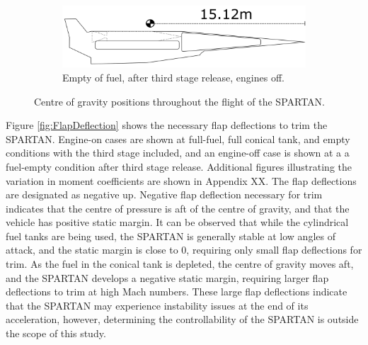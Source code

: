 \begin{figure}
\begin{subfigure}{.5\textwidth}
			\end{subfigure}
			\begin{subfigure}{.5\textwidth}
				\centering
				\includegraphics[width=0.9\linewidth]{figures/3_vehicle_design/CG5}
				\caption{Empty of fuel, after third stage release, engines off.}
				
			\end{subfigure}
			\caption{Centre of gravity positions throughout the flight of the SPARTAN.}
			\label{fig:CentreOfGravity}
		\end{figure}
		
		
		
		
		Figure \ref{fig:FlapDeflection} shows the necessary flap deflections to trim the SPARTAN. Engine-on cases are shown at full-fuel, full conical tank, and empty conditions with the third stage included, and an engine-off case is shown at a a fuel-empty condition after third stage release. Additional figures illustrating the variation in moment coefficients are shown in Appendix XX.
		The flap deflections are designated as negative up. Negative flap deflection necessary for trim indicates that the centre of pressure is aft of the centre of gravity, and that the vehicle has positive static margin.
		It can be observed that while the cylindrical fuel tanks are being used, the SPARTAN is generally stable at low angles of attack, and the static margin is close to 0, requiring only small flap deflections for trim. As the fuel in the conical tank is depleted, the centre of gravity moves aft, and the SPARTAN develops a negative static margin, requiring larger flap deflections to trim at high Mach numbers. These large flap deflections indicate that the SPARTAN may experience instability issues at the end of its acceleration, however, determining the controllability of the SPARTAN is outside the scope of this study. 
		

